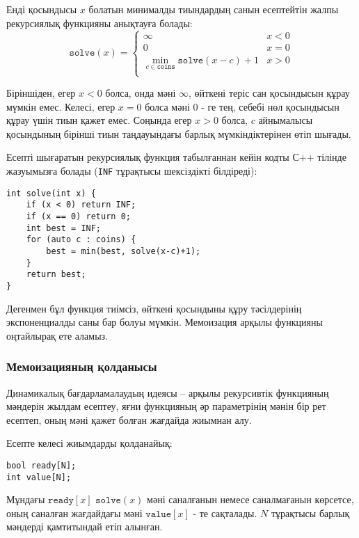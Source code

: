 Енді қосындысы $x$ болатын минималды тиындардың санын есептейтін
жалпы рекурсиялық функцияны анықтауға болады:
\begin{equation*}
    \texttt{solve}(x) = \begin{cases}
               \infty               & x < 0\\
               0               & x = 0\\
               \min_{c \in \texttt{coins}} \texttt{solve}(x-c)+1 & x > 0 \\
           \end{cases}
\end{equation*}

Біріншіден, егер $x<0$ болса, онда мәні $\infty$,
өйткені теріс сан қосындысын құрау мүмкін емес.
Келесі, егер $x=0$ болса мәні $0$ - ге тең,
себебі нөл қосындысын құрау үшін тиын қажет емес.
Соңында егер $x>0$ болса, $c$ айнымалысы 
қосындының бірінші тиын таңдауындағы барлық 
мүмкіндіктерінен өтіп шығады.

Есепті шығаратын рекурсиялық функция табылғаннан кейін
кодты С++ тілінде жазуымызға болады (\texttt{INF} тұрақтысы шексіздікті
білдіреді):

\begin{lstlisting}
int solve(int x) {
    if (x < 0) return INF;
    if (x == 0) return 0;
    int best = INF;
    for (auto c : coins) {
        best = min(best, solve(x-c)+1);
    }
    return best;
}
\end{lstlisting}

Дегенмен бұл функция тиімсіз, өйткені қосындыны құру тәсілдерінің экспоненциалды саны бар болуы мүмкін. Мемоизация арқылы функцияны оңтайлырақ
ете аламыз.

\subsubsection{Мемоизацияның қолданысы}


Динамикалық бағдарламалаудың идеясы --
 арқылы рекурсивтік функцияның
мәндерін жылдам есептеу, 
яғни функцияның әр параметрінің
мәнін бір рет есептеп, оның мәні қажет 
болған жағдайда жиымнан алу.

Есепте келесі жиымдарды қолданайық:
\begin{lstlisting}
bool ready[N];
int value[N];
\end{lstlisting}

Мұндағы $\texttt{ready}[x]$  $\texttt{solve}(x)$ мәні саналғанын немесе саналмағанын көрсетсе,
оның саналған жағдайдағы мәні $\texttt{value}[x]$ - те сақталады.
$N$ тұрақтысы барлық мәндерді қамтитындай етіп алынған.

